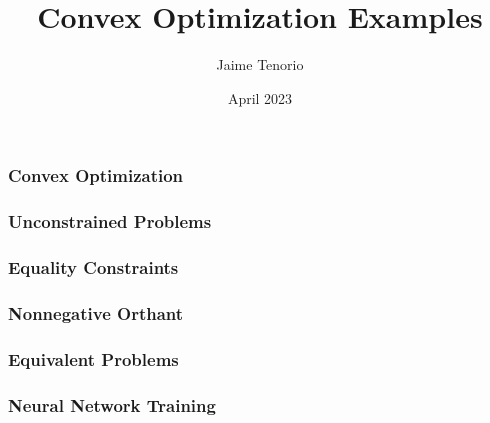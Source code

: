 \documentclass{beamer}
\title{Convex Optimization Examples}
\author{Jaime Tenorio}
\date{April 2023}
\begin{document}
\maketitle

\begin{frame}
    \frametitle{Convex Optimization}
    
\end{frame}

\begin{frame}
        
\end{frame}

\begin{frame}
    \frametitle{Unconstrained Problems}
    
\end{frame}

\begin{frame}
    
\end{frame}

\begin{frame}
    \frametitle{Equality Constraints}
    
\end{frame}

\begin{frame}
    
\end{frame}

\begin{frame}
    \frametitle{Nonnegative Orthant}
    
\end{frame}

\begin{frame}
    
\end{frame}

\begin{frame}
    \frametitle{Equivalent Problems}
    \fontsize{10}{10}\selectfont
    
\end{frame}

\begin{frame}
    
\end{frame}

\begin{frame}
    \frametitle{Neural Network Training}
    
\end{frame}

\begin{frame}
    \fontsize{10}{10}\selectfont
    
\end{frame}

\begin{frame}
    \fontsize{10}{10}\selectfont
    
\end{frame}

\begin{frame}
    \fontsize{10}{10}\selectfont
    
\end{frame}

\begin{frame}
    
\end{frame}
\end{document}
